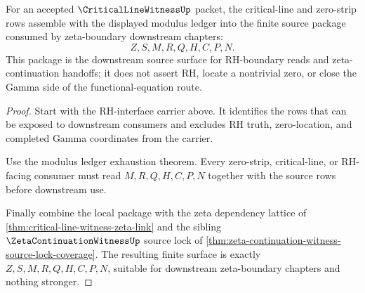 \begin{theorem}
\label{thm:critical-line-witness-downstream-source-package}
For an accepted $\CriticalLineWitnessUp$ packet, the critical-line and zero-strip rows assemble with the displayed modulus ledger into the finite source package consumed by zeta-boundary downstream chapters:
$$
Z,S,M,R,Q,H,C,P,N.
$$
This package is the downstream source surface for RH-boundary reads and zeta-continuation handoffs; it does not assert RH, locate a nontrivial zero, or close the Gamma side of the functional-equation route.
\end{theorem}
\begin{proof}
Start with the RH-interface carrier above. It identifies the rows that can be exposed to downstream consumers and excludes RH truth, zero-location, and completed Gamma coordinates from the carrier.

Use the modulus ledger exhaustion theorem. Every zero-strip, critical-line, or RH-facing consumer must read $M,R,Q,H,C,P,N$ together with the source rows before downstream use.

Finally combine the local package with the zeta dependency lattice of \autoref{thm:critical-line-witness-zeta-link} and the sibling $\ZetaContinuationWitnessUp$ source lock of \autoref{thm:zeta-continuation-witness-source-lock-coverage}. The resulting finite surface is exactly $Z,S,M,R,Q,H,C,P,N$, suitable for downstream zeta-boundary chapters and nothing stronger.
\end{proof}
